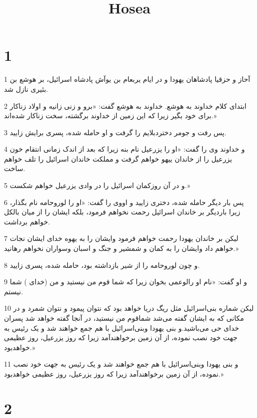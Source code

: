 

\title{Hosea}


\chapter{1}

\par 1 آحاز و حزقیا پادشاهان یهودا و در ایام یربعام بن یوآش پادشاه اسرائیل، بر هوشع بن بئیری نازل شد.
\par 2 ابتدای کلام خداوند به هوشع. خداوند به هوشع گفت: «برو و زنی زانیه و اولاد زناکار برای خود بگیر زیرا که این زمین از خداوند برگشته، سخت زناکار شده‌اند.»
\par 3 پس رفت و جومر دختردبلایم را گرفت و او حامله شده، پسری برایش زایید.
\par 4 و خداوند وی را گفت: «او را یزرعیل نام بنه زیرا که بعد از اندک زمانی انتقام خون یزرعیل را از خاندان ییهو خواهم گرفت و مملکت خاندان اسرائیل را تلف خواهم ساخت.
\par 5 و در آن روزکمان اسرائیل را در وادی یزرعیل خواهم شکست.»
\par 6 پس بار دیگر حامله شده، دختری زایید و اووی را گفت: «او را لوروحامه نام بگذار، زیرا باردیگر بر خاندان اسرائیل رحمت نخواهم فرمود، بلکه ایشان را از میان بالکل خواهم برداشت.
\par 7 لیکن بر خاندان یهودا رحمت خواهم فرمود وایشان را به یهوه خدای ایشان نجات خواهم داد وایشان را به کمان و شمشیر و جنگ و اسبان وسواران نخواهم رهانید.»
\par 8 و چون لوروحامه را از شیر بازداشته بود، حامله شده، پسری زایید.
\par 9 و او گفت: «نام او رالوعمی بخوان زیرا که شما قوم من نیستید و من (خدای ) شما نیستم.
\par 10 لیکن شماره بنی‌اسرائیل مثل ریگ دریا خواهد بود که نتوان پیمود و نتوان شمرد و در مکانی که به ایشان گفته می‌شد شماقوم من نیستید، در آنجا گفته خواهد شد پسران خدای حی می‌باشید.و بنی یهودا وبنی‌اسرائیل با هم جمع خواهند شد و یک رئیس به جهت خود نصب نموده، از آن زمین برخواهندآمد زیرا که روز یزرعیل، روز عظیمی خواهدبود.»
\par 11 و بنی یهودا وبنی‌اسرائیل با هم جمع خواهند شد و یک رئیس به جهت خود نصب نموده، از آن زمین برخواهندآمد زیرا که روز یزرعیل، روز عظیمی خواهدبود.»

\chapter{2}

